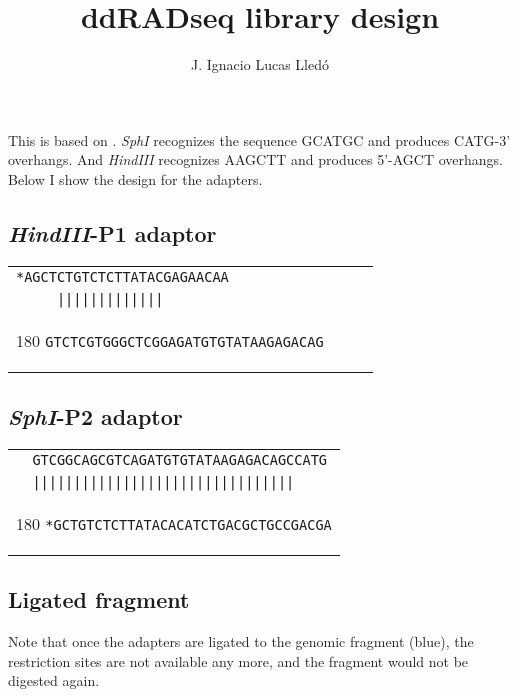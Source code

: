 \documentclass[a4paper,12pt]{article}
\author{J. Ignacio Lucas Lledó}
\title{ddRADseq library design}
\begin{document}
\maketitle
\begin{flushleft}
This is based on \cite{Salas-Lizana2018}. \emph{SphI} recognizes the sequence \textsf{GCATGC} and produces \textsf{CATG}-3' overhangs. And \emph{HindIII} recognizes \textsf{AAGCTT} and produces 5'-\textsf{AGCT} overhangs. Below I show the design for the adapters.

\subsection*{\emph{HindIII}-P1 adaptor}
\begin{tabular}{l}
\verb+*AGCTCTGTCTCTTATACGAGAACAA+\\
\verb+     |||||||||||||+\\[-8pt]
   \begin{turn}{180}
   \verb+GTCTCGTGGGCTCGGAGATGTGTATAAGAGACAG     +
   \end{turn}
\\
\end{tabular}
\vspace*{0.3cm}

\subsection*{\emph{SphI}-P2 adaptor}

\begin{tabular}{l}
\verb+  GTCGGCAGCGTCAGATGTGTATAAGAGACAGCCATG+\\
\verb+  ||||||||||||||||||||||||||||||||+\\[-8pt]
   \begin{turn}{180}
   \verb+*GCTGTCTCTTATACACATCTGACGCTGCCGACGA+
   \end{turn}
\\
\end{tabular}
\vspace*{0.3cm}

\subsection*{Ligated fragment}
Note that once the adapters are ligated to the genomic fragment (blue), the restriction sites are not available any more, and the fragment would not be digested again.


\end{flushleft}
\end{document}
